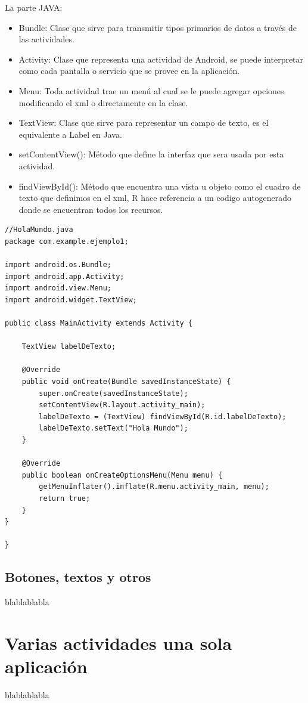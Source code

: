 \documentclass[11pt]{book}
\begin{document}
La parte JAVA:

\begin{itemize}
\item Bundle: Clase que sirve para transmitir tipos primarios de datos a través de las actividades.
\item Activity: Clase que representa una actividad de Android, se puede interpretar como cada pantalla o servicio que se provee en la aplicación.
\item Menu: Toda actividad trae un menú al cual se le puede agregar opciones modificando el xml o directamente en la clase.
\item TextView: Clase que sirve para representar un campo de texto, es el equivalente a Label en Java.
\item setContentView(): Método que define la interfaz que sera usada por esta actividad.
\item findViewById(): Método que encuentra una vista u objeto como el cuadro de texto que definimos en el xml, R hace referencia a un codigo autogenerado donde se encuentran todos los recursos.
\end{itemize}
\newpage
\begin{lstlisting}
//HolaMundo.java
package com.example.ejemplo1;

import android.os.Bundle;
import android.app.Activity;
import android.view.Menu;
import android.widget.TextView;

public class MainActivity extends Activity {
	
    TextView labelDeTexto;

    @Override
    public void onCreate(Bundle savedInstanceState) {
        super.onCreate(savedInstanceState);
        setContentView(R.layout.activity_main);
        labelDeTexto = (TextView) findViewById(R.id.labelDeTexto);
        labelDeTexto.setText("Hola Mundo");
    }

    @Override
    public boolean onCreateOptionsMenu(Menu menu) {
        getMenuInflater().inflate(R.menu.activity_main, menu);
        return true;
    }
}

}

\end{lstlisting}
\section{Botones, textos y otros}
blablablabla

\chapter{Varias actividades una sola aplicación}              
blablablabla
\end{document}
